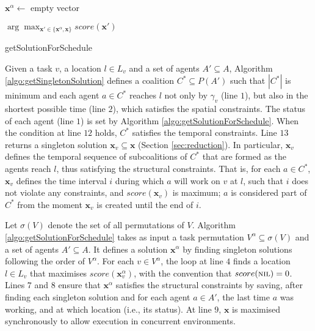 \begin{algorithm}[t]
    \DontPrintSemicolon
    $\bm{x}^\alpha \gets$ empty vector\;

    \Return $\arg \max_{\bm{x}' \in \{\bm{x}^\alpha,
    \bm{x}\}} score(\bm{x'})$ 
    \caption{\textsf{getSolutionForSchedule}\label{algo:getSolutionForSchedule}}
\end{algorithm}

Given a task $v$, a location $l \in L_v$ and a set of agents $A' \subseteq A$, Algorithm
\ref{algo:getSingletonSolution} defines a coalition $C^\ast \subseteq P(A')$ such that
$|C^\ast|$ is minimum and each agent $a \in C^\ast$ reaches $l$ not only by $\gamma_v$
(line $1$), but also in the shortest possible time (line $2$), which satisfies the spatial
constraints. The \textsf{status} of each agent (line $1$) is set by Algorithm
\ref{algo:getSolutionForSchedule}. When the condition at line $12$ holds, $C^\ast$
satisfies the temporal constraints. Line $13$ returns a singleton solution $\bm{x}_v
\subseteq \bm{x}$ (Section \ref{sec:reduction}). In particular, $\bm{x}_v$ defines the
temporal sequence of subcoalitions of $C^\ast$ that are formed as the agents reach $l$,
thus satisfying the structural constraints.
That is, for each $a \in C^\ast$, $\bm{x}_v$ defines the time interval $i$ during which
$a$ will work on $v$ at $l$, such that $i$ does not violate any constraints, and
$score(\bm{x}_v)$ is maximum; $a$ is considered part of $C^\ast$ from the moment
$\bm{x}_v$ is created until the end of $i$.

Let $\sigma(V)$ denote the set of all permutations of $V$. Algorithm
\ref{algo:getSolutionForSchedule} takes as input a task permutation $V^\alpha \subseteq
\sigma(V)$ and a set of agents $A' \subseteq A$. It defines a solution $\bm{x}^\alpha$ by
finding singleton solutions following the order of $V^\alpha$. For each $v \in V^\alpha$,
the loop at line $4$ finds a location $l \in L_v$ that maximises $score(\bm{x}_v^\alpha)$,
with the convention that $score(\text{\textsc{nil}}) = 0$.
Lines $7$ and $8$ ensure that $\bm{x}^\alpha$ satisfies the structural constraints by
saving, after finding each singleton solution and for each agent $a \in A'$, the last time
$a$ was working, and at which location (i.e., its \textsf{status}).
At line $9$, $\bm{x}$ is maximised synchronously to allow execution in concurrent
environments.

